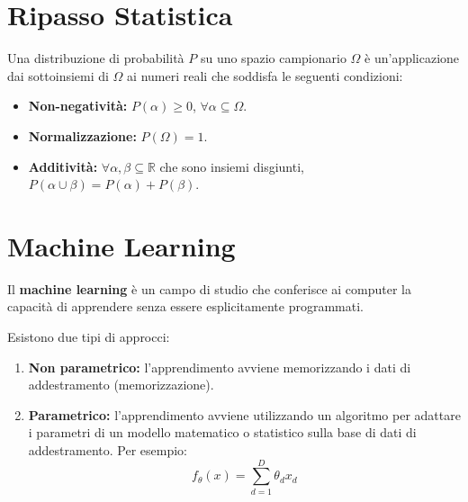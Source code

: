 \section{Ripasso Statistica}
\begin{defn}
  Una distribuzione di probabilità $P$ su uno spazio campionario $\Omega$ è un'applicazione dai sottoinsiemi di $\Omega$ ai numeri reali che soddisfa le seguenti condizioni:
  \begin{itemize}
    \item \textbf{Non-negatività:} $P(\alpha) \ge 0$, $\forall \alpha \subseteq \Omega$.
    \item \textbf{Normalizzazione:} $P(\Omega) = 1$.
    \item \textbf{Additività:} $\forall \alpha, \beta \subseteq \mathbb{R}$ che sono insiemi disgiunti, $P(\alpha \cup \beta) = P(\alpha) + P(\beta)$.
  \end{itemize}
\end{defn}


\section{Machine Learning}
\begin{defn}
Il \textbf{machine learning} è un campo di studio
che conferisce ai computer la capacità di apprendere senza essere
esplicitamente programmati.
\end{defn}

Esistono due tipi di approcci:
\begin{enumerate}
  \item \textbf{Non parametrico:} l'apprendimento avviene memorizzando i dati di addestramento (memorizzazione).
  \item \textbf{Parametrico:} l'apprendimento avviene utilizzando un algoritmo per adattare i parametri di un modello matematico o statistico sulla base di dati di addestramento. Per esempio:
    \[
    f_{\theta}(x) = \sum^D_{d=1}{\theta_d x_d}
    \]
\end{enumerate}


